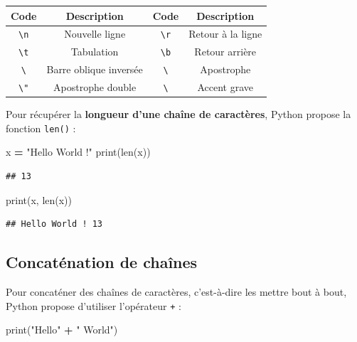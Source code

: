 \documentclass[12pt,]{book}
\newenvironment{Shaded}{\begin{snugshade}}{\end{snugshade}}
\newcommand{\StringTok}[1]{\textcolor[rgb]{0.31,0.60,0.02}{#1}}
\newcommand{\OperatorTok}[1]{\textcolor[rgb]{0.81,0.36,0.00}{\textbf{#1}}}
\newcommand{\BuiltInTok}[1]{#1}
\newcommand{\NormalTok}[1]{#1}
\numberwithin{equation}{section}
\numberwithin{countremarque}{section}
\begin{document}
\begin{longtable}[]{@{}cccc@{}}
\toprule
Code & Description & Code & Description\tabularnewline
\midrule
\endhead
\texttt{\textbackslash{}n} & Nouvelle ligne & \texttt{\textbackslash{}r}
& Retour à la ligne\tabularnewline
\texttt{\textbackslash{}t} & Tabulation & \texttt{\textbackslash{}b} &
Retour arrière\tabularnewline
\texttt{\textbackslash{}} & Barre oblique inversée &
\texttt{\textbackslash{}\textquotesingle{}} & Apostrophe\tabularnewline
\texttt{\textbackslash{}"} & Apostrophe double &
\texttt{\textbackslash{}\textasciigrave{}} & Accent grave\tabularnewline
\bottomrule
\end{longtable}

Pour récupérer la \textbf{longueur d'une chaîne de caractères}, Python
propose la fonction \texttt{len()} :

\begin{Shaded}
\begin{Highlighting}[]
\NormalTok{x }\OperatorTok{=} \StringTok{"Hello World !"}
\BuiltInTok{print}\NormalTok{(}\BuiltInTok{len}\NormalTok{(x))}
\end{Highlighting}
\end{Shaded}

\begin{lstlisting}
## 13
\end{lstlisting}

\begin{Shaded}
\begin{Highlighting}[]
\BuiltInTok{print}\NormalTok{(x, }\BuiltInTok{len}\NormalTok{(x))}
\end{Highlighting}
\end{Shaded}

\begin{lstlisting}
## Hello World ! 13
\end{lstlisting}

\subsection{Concaténation de chaînes}\label{type-chaines-concatenation}

Pour concaténer des chaînes de caractères, c'est-à-dire les mettre bout
à bout, Python propose d'utiliser l'opérateur \texttt{+} :

\begin{Shaded}
\begin{Highlighting}[]
\BuiltInTok{print}\NormalTok{(}\StringTok{"Hello"} \OperatorTok{+} \StringTok{" World"}\NormalTok{)}
\end{Highlighting}
\end{Shaded}
\end{document}
